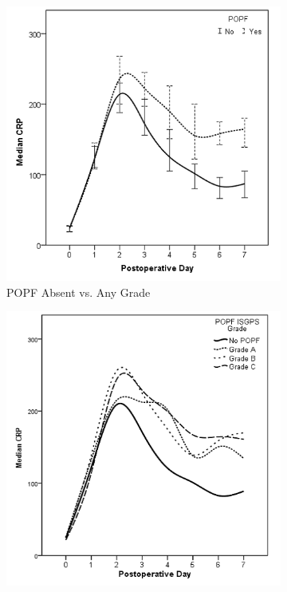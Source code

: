 \clearpage
\begin{figure}[t]
	\caption{Serum CRP levels in the first week after pancreaticoduodenectomy in patients with postoperative pancreatic fistula (POPF).}
	\label{fig:crp_comp_crp_popf}
	\centering
	\begin{subfigure}{0.48\textwidth}
		\centering
		\includegraphics[width=\textwidth]{Figures/crp_comp_crp_popf_yes_no}
		\caption{POPF Absent vs. 
Any Grade}
		\label{fig:crp_comp_crp_popf_yes_no}
	\end{subfigure}
	\hfill
	\begin{subfigure}{0.48\textwidth}
		\centering
		\includegraphics[width=\textwidth]{Figures/crp_comp_crp_popf_isgps}

\end{subfigure}
\end{figure}
